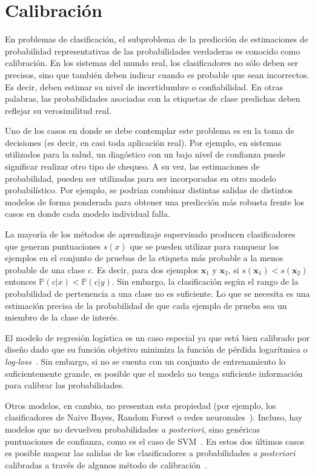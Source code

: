 \chapter{Calibración}\label{appendix:calibracion} 

En problemas de clasificación, el subproblema de la predicción de estimaciones
de probabilidad representativas de las probabilidades verdaderas es conocido
como calibración. En los sistemas del mundo real, los clasificadores no sólo
deben ser precisos, sino que también deben indicar cuando es probable que sean
incorrectos. Es decir, deben estimar su nivel de incertidumbre o confiabilidad.
En otras palabras, las probabilidades asociadas con la etiquetas de clase
predichas deben reflejar su verosimilitud real.

Uno de los casos en donde se debe contemplar este problema es en la toma de
decisiones (es decir, en casi toda aplicación real). Por ejemplo, en sistemas
utilizados para la salud, un diagóstico con un bajo nivel de confianza puede
significar realizar otro tipo de chequeo. A su vez, las estimaciones de
probabilidad, pueden ser utilizadas para ser incorporadas en otro modelo
probabilístico. Por ejemplo, se podrían combinar distintas salidas de distintos
modelos de forma ponderada para obtener una predicción más robusta frente los
casos en donde cada modelo individual falla.

La mayoría de los métodos de aprendizaje supervisado producen clasificadores que
generan puntuaciones $s(x)$ que se pueden utilizar para ranquear los ejemplos en
el conjunto de pruebas de la etiqueta más probable a la menos probable de una
clase $c$. Es decir, para dos ejemplos $ \mathbf{x}_1$ y $ \mathbf{x}_2$, si $s( \mathbf{x}_1) < s( \mathbf{x}_2)$
entonces $\mathbb{P}(c|x) < \mathbb{P}(c|y)$. Sin embargo, la clasificación según el rango de la
probabilidad de pertenencia a una clase no es suficiente. Lo que se necesita es
una estimación precisa de la probabilidad de que cada ejemplo de prueba sea un
miembro de la clase de interés.

El modelo de regresión logística es un caso especial ya que está bien calibrado
por diseño dado que su función objetivo minimiza la función de pérdida
logarítmica o {\it log-loss\/}~\cite{morrison2013tutorial}. Sin  embargo, si no
se cuenta con un conjunto de entrenamiento lo suficientemente grande, es posible
que el modelo no tenga suficiente información para calibrar las probabilidades.

Otros modelos, en cambio, no presentan esta propiedad (por ejemplo, los
clasificadores de Naive Bayes, Random Forest o redes
neuronales~\cite{zadrozny2002transforming, niculescu2005predicting,
guo2017calibration}). Incluso, hay modelos que no devuelven probabilidades {\it
a posteriori}, sino genéricas puntuaciones de confianza, como es el caso de
SVM~\cite{platt1999probabilistic}. En estos dos últimos casos es posible mapear
las salidas de los clasificadores a probabilidades {\it a posteriori\/}
calibradas a través de algunos método de
calibración~\cite{platt1999probabilistic, zadrozny2002transforming,
niculescu2005predicting, guo2017calibration}.

